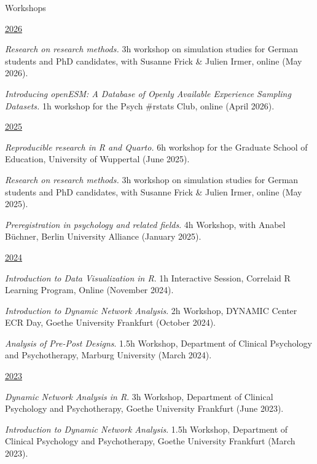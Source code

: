 \documentclass{resume} %
\begin{document}
\begin{rSection}{Workshops}

\underline{2026}
\begin{etaremune}

\item \textit{Research on research methods.} 3h workshop on simulation studies for German students and PhD candidates, with Susanne Frick \& Julien Irmer, online (May 2026).

\item \textit{Introducing openESM: A Database of Openly Available Experience Sampling Datasets.}  1h workshop for the Psych \#rstats Club, online (April 2026).

\hspace{-0.75cm}\underline{2025}
\item \textit{Reproducible research in R and Quarto.} 6h workshop for the Graduate School of Education, University of Wuppertal (June 2025).

\item \textit{Research on research methods.} 3h workshop on simulation studies for German students and PhD candidates, with Susanne Frick \& Julien Irmer, online (May 2025).

\item \textit{Preregistration in psychology and related fields}. 4h Workshop, with Anabel Büchner, Berlin University Alliance (January 2025).


\hspace{-0.75cm}\underline{2024}
\item \textit{Introduction to Data Visualization in R}. 1h Interactive Session, Correlaid R Learning Program, Online (November 2024).

\item \textit{Introduction to Dynamic Network Analysis}. 2h Workshop, DYNAMIC Center ECR Day, Goethe University Frankfurt (October 2024).

\item \textit{Analysis of Pre-Post Designs}. 1.5h Workshop, Department of Clinical Psychology and Psychotherapy, Marburg University (March 2024).


\hspace{-0.75cm}\underline{2023}
\item \textit{Dynamic Network Analysis in R}. 3h Workshop, Department of Clinical Psychology and Psychotherapy, Goethe University Frankfurt (June 2023).

\item \textit{Introduction to Dynamic Network Analysis}. 1.5h Workshop, Department of Clinical Psychology and Psychotherapy, Goethe University Frankfurt (March 2023).
\end{etaremune}


\end{rSection}
\end{document}
